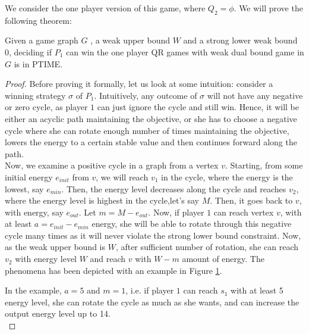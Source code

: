 We consider the one player version of this game, where $Q_2= \phi$. We will prove the following theorem:\\

\begin{theorem}
\label{one-player-weak-thm}
Given a game graph $G$ , a weak upper bound $W$ and a strong lower weak bound $0$, deciding if $P_1$ can win the one player QR games with weak dual bound game in $G$ is in PTIME.
\end{theorem}

\begin{proof}
  Before proving it formally, let us look at some intuition: consider a winning strategy $\sigma$ of $P_1$. Intuitively, any outcome of $\sigma$ will not have any negative or zero cycle, as player $1$ can just ignore the cycle and still win. Hence, it will be either an acyclic path maintaining the objective, or she has to choose a negative cycle where she can rotate enough number of times maintaining the objective, lowers the energy to a certain stable value and then continues forward along the path.\\
  \vskip 0.2cm
  Now, we examine a positive cycle in a graph from a vertex $v$. Starting, from some initial energy $e_{init}$ from $v$, we will reach $v_1$ in the cycle, where the energy is the lowest, say $e_{min}$. Then, the energy level decreases along the cycle and reaches $v_2$, where the energy level is highest in the cycle,let's say $M$. Then, it goes back to $v$, with energy, say $e_{out}$. Let $m=M - e_{out}$. Now, if player $1$ can reach vertex $v$, with at least $a= e_{init} - e_{min}$ energy, she will be able to rotate through this negative cycle many times as it will never violate the strong lower bound constraint. Now, as the weak upper bound is $W$, after sufficient number of rotation, she can reach $v_2$ with energy level $W$ and reach $v$ with $W-m$ amount of energy. The phenomena has been depicted with an example in Figure \ref{energy-positivecycle}.\\
  
  \begin{figure}[htb]
  \label{energy-positivecycle}
  
  \end{figure}
  \vskip 0.1cm
  In the example, $a=5$ and $m=1$, i.e. if player $1$ can reach $s_1$ with at least 5 energy level, she can rotate the cycle as much as she wants, and can increase the output energy level up to 14.\\
  

\end{proof}
